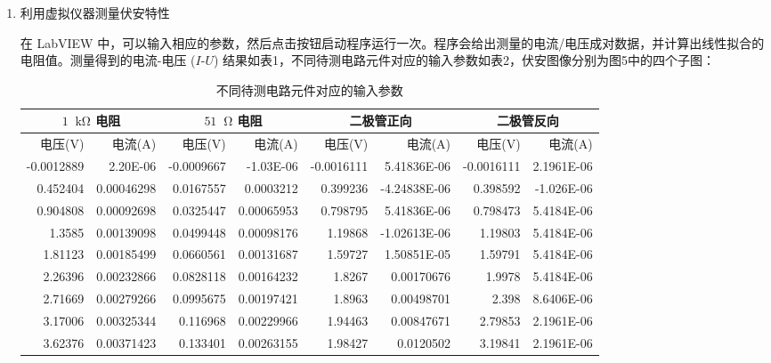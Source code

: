 \documentclass[11pt]{article}
\newcommand*{\unit}[1]{\mathop{}\!\mathrm{#1}}
\begin{document}
\begin{enumerate}

\item 利用虚拟仪器测量伏安特性

在 LabVIEW 中，可以输入相应的参数，然后点击按钮启动程序运行一次。程序会给出测量的电流/电压成对数据，并计算出线性拟合的电阻值。测量得到的电流-电压 ($I$-$U$) 结果如表1，不同待测电路元件对应的输入参数如表2，伏安图像分别为图5中的四个子图：

\begin{table}[H]
    \centering
    \caption{不同待测电路元件对应的输入参数}
    \begin{tabular}{|r|r|r|r|r|r|r|r|}
        \hline
        \multicolumn{2}{|c|}{$1 \unit{k\Omega}$ 电阻} & \multicolumn{2}{c|}{$51 \unit{\Omega}$ 电阻} & \multicolumn{2}{c|}{二极管正向} &\multicolumn{2}{c|}{二极管反向} \bigstrut\\
        \hline
        电压(V) & 电流(A) & 电压(V) & 电流(A) & 电压(V) & 电流(A) & 电压(V) & 电流(A) \bigstrut\\
        \hline
        -0.0012889 & 2.20E-06 & -0.0009667 & -1.03E-06 & -0.0016111 & 5.41836E-06 & -0.0016111 & 2.1961E-06 \bigstrut\\
        \hline
        0.452404 & 0.00046298 & 0.0167557 & 0.0003212 & 0.399236 & -4.24838E-06 & 0.398592 & -1.026E-06 \bigstrut\\
        \hline
        0.904808 & 0.00092698 & 0.0325447 & 0.00065953 & 0.798795 & 5.41836E-06 & 0.798473 & 5.4184E-06 \bigstrut\\
        \hline
        1.3585 & 0.00139098 & 0.0499448 & 0.00098176 & 1.19868 & -1.02613E-06 & 1.19803 & 5.4184E-06 \bigstrut\\
        \hline
        1.81123 & 0.00185499 & 0.0660561 & 0.00131687 & 1.59727 & 1.50851E-05 & 1.59791 & 5.4184E-06 \bigstrut\\
        \hline
        2.26396 & 0.00232866 & 0.0828118 & 0.00164232 & 1.8267 & 0.00170676 & 1.9978 & 5.4184E-06 \bigstrut\\
        \hline
        2.71669 & 0.00279266 & 0.0995675 & 0.00197421 & 1.8963 & 0.00498701 & 2.398 & 8.6406E-06 \bigstrut\\
        \hline
        3.17006 & 0.00325344 & 0.116968 & 0.00229966 & 1.94463 & 0.00847671 & 2.79853 & 2.1961E-06 \bigstrut\\
        \hline
        3.62376 & 0.00371423 & 0.133401 & 0.00263155 & 1.98427 & 0.0120502 & 3.19841 & 2.1961E-06 \bigstrut\\
        \hline

\end{tabular}
\end{table}
\end{enumerate}
\end{document}
